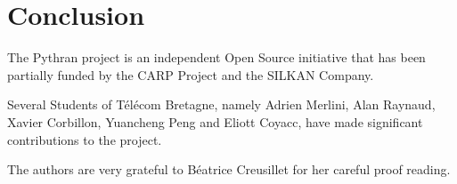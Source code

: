 \documentclass[10pt, preprint]{sigplanconf}
\begin{document}
\section*{Conclusion}

\acks

The Pythran project is an independent Open Source initiative that has been
partially funded by the CARP Project and the SILKAN Company.

Several Students of Télécom Bretagne, namely Adrien Merlini, Alan Raynaud,
Xavier Corbillon, Yuancheng Peng and Eliott Coyacc, have made significant
contributions to the project.

The authors are very grateful to Béatrice Creusillet for her careful proof reading.




\end{document}
